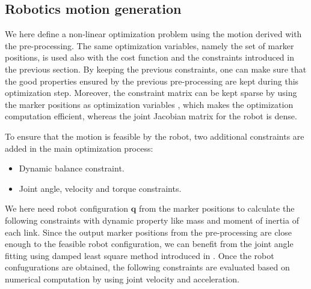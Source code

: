 \documentclass[letterpaper, 10 pt, conference]{ieeeconf}  %
\begin{document}


\subsection{Robotics motion generation}


We here define a non-linear optimization problem using the motion
derived with the pre-processing. 
The same optimization variables, namely the set of marker positions,
is used also with the cost function and the constraints introduced in
the previous section.
By keeping the previous constraints, one can make sure that the good
properties ensured by the previous pre-processing are kept during this
optimization step.
Moreover, the constraint matrix can be kept sparse by 
using the marker positions as optimization variables 
\cite{Komura10}, which makes the optimization computation efficient,
whereas the joint Jacobian matrix for the robot is dense.

To ensure that the motion is feasible by the robot, two
additional constraints are added in the main optimization process:
\begin{itemize}
\item Dynamic balance constraint.
\item Joint angle, velocity and torque constraints.
\end{itemize}

We here need robot configuration $\mathbf{q}$ from the marker
positions to calculate the following constraints with dynamic property
like mass and moment of inertia of each link.
Since the output marker positions from the pre-processing are close
enough to the feasible robot configuration, we can benefit from the
joint angle fitting using damped least square method introduced in
\cite{Nakaoka12Humanoids}. 
Once the robot confugurations are obtained, the following 
constraints are evaluated based on numerical computation by using
joint velocity and acceleration.
 
\end{document}

